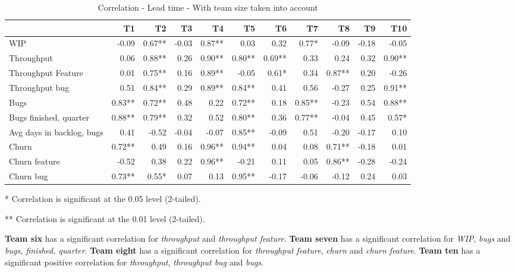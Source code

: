 \documentclass[UKenglish]{ifimaster}  %
\begin{document}
\begin{table}[H]
  \begin{adjustwidth}{-2.5cm}{}
 \centering
 \begin{tabular}{|l|r|r|r|r|r|r|r|r|r|r|}
\hline
 &  \bf{T1} & \bf{T2} & \bf{T3} & \bf{T4} & \bf{T5} & \bf{T6} & \bf{T7} & \bf{T8} & \bf{T9} & \bf{T10}\\ \hline
 WIP  & -0.09 & 0.67** & -0.03 & 0.87** & 0.03 & 0.32 & 0.77* & -0.09 & -0.18 & -0.05 \\ \hline
 Throughput  & 0.06 & 0.88** & 0.26 & 0.90** & 0.80** & 0.69** & 0.33 & 0.24 & 0.32 & 0.90** \\ \hline
 Throughput Feature  & 0.01 & 0.75** & 0.16 & 0.89** & -0.05 & 0.61* & 0.34 & 0.87** & 0.20 & -0.26 \\ \hline
 Throughput bug  & 0.51 & 0.84** & 0.29 & 0.89** & 0.84** & 0.41 & 0.56 & -0.27 & 0.25 & 0.91** \\ \hline
 Bugs  & 0.83** & 0.72** & 0.48 & 0.22 & 0.72** & 0.18 & 0.85** & -0.23 & 0.54 & 0.88** \\ \hline
 Bugs finished, quarter  & 0.88** & 0.79** & 0.32 & 0.52 & 0.80** & 0.36 & 0.77** & -0.04 & 0.45 & 0.57* \\ \hline
 Avg days in backlog, bugs  & 0.41 & -0.52 & -0.04 & -0.07 & 0.85** & -0.09 & 0.51 & -0.20 & -0.17 & 0.10 \\ \hline
 Churn  & 0.72** & 0.49 & 0.16 & 0.96** & 0.94** & 0.04 & 0.08 & 0.71** & -0.18 & 0.01 \\ \hline
 Churn feature  & -0.52 & 0.38 & 0.22 & 0.96** & -0.21 & 0.11 & 0.05 & 0.86** & -0.28 & -0.24 \\ \hline
 Churn bug  & 0.73** & 0.55* & 0.07 & 0.13 & 0.95** & -0.17 & -0.06 & -0.12 & 0.24 & 0.03 \\ \hline
\end{tabular}
 \caption{Correlation - Lead time - With team size taken into account}
 \label{corr:LT:V2}
 \centerline {* Correlation is significant at the 0.05 level (2-tailed).}
\centerline{** Correlation is significant at the 0.01 level (2-tailed).}
\end{adjustwidth}
\end{table}

\textbf{Team six} has a significant correlation for \textit{throughput} and \textit{throughput feature}. \textbf{Team seven} has a significant correlation for \textit{WIP}, \textit{bugs} and \textit{bugs, finished, quarter}. \textbf{Team eight} has a significant correlation for \textit{throughput feature}, \textit{churn} and \textit{churn feature}. \textbf{Team ten} has a significant positive correlation for \textit{throughput}, \textit{throughput bug} and \textit{bugs}.  
\end{document}
